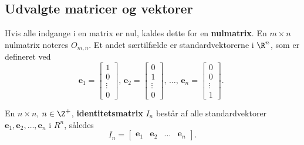 \subsection{Udvalgte matricer og vektorer} 
% 
Hvis alle indgange i en matrix er nul, kaldes dette for en \textbf{nulmatrix}. 
En $m \times n$ nulmatrix noteres $O_{m,n}$.
%
Et andet særtilfælde er standardvektorerne i $\R^n$, som er defineret ved  
%
$$
\textbf{e}_1=
\begin{bmatrix}
1 \\ 
0 \\ 
\vdots \\
0
\end{bmatrix}
\text{, }
\textbf{e}_2=
\begin{bmatrix}
0 \\ 
1 \\ 
\vdots \\
0
\end{bmatrix}
\text{, }
\ldots
\text{, }
\textbf{e}_n=
\begin{bmatrix}
0 \\ 
0 \\ 
\vdots \\
1
\end{bmatrix}
\text{. }
$$
%
\begin{defn}{}{}
%
En $n \times n$, $n \in \Z^+$, \textbf{identitetsmatrix} $I_n$ består af alle standardvektorer $\textbf{e}_1, \textbf{e}_2, \ldots, \textbf{e}_n$ i $R^n$, således 
$$
I_n=
\begin{bmatrix}
\textbf{e}_1 & \textbf{e}_2 & \ldots & \textbf{e}_n
\end{bmatrix}.
$$ 
\end{defn}
\noindent
%
